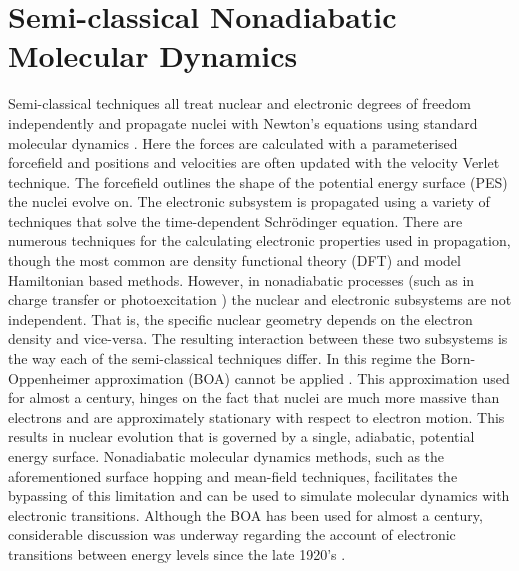 \section{Semi-classical Nonadiabatic Molecular Dynamics}
Semi-classical techniques all treat nuclear and electronic degrees of freedom independently and propagate nuclei with Newton's equations using standard molecular dynamics \cite{Coker1995Jan}. Here the forces are calculated with a parameterised forcefield and positions and velocities are often updated with the velocity Verlet technique. The forcefield outlines the shape of the potential energy surface (PES) the nuclei evolve on. The electronic subsystem is propagated using a variety of techniques that solve the time-dependent Schr\"odinger equation. There are numerous techniques for the calculating electronic properties used in propagation, though the most common are density functional theory (DFT) and model Hamiltonian based methods. However, in nonadiabatic processes (such as in charge transfer \cite{PhysRevB.79.115203} or photoexcitation \cite{Hammes-Schiffer2001Apr, Hammes-Schiffer1994Sep, Huynh2007}) the nuclear and electronic subsystems are not independent. That is, the specific nuclear geometry depends on the electron density and vice-versa. The resulting interaction between these two subsystems is the way each of the semi-classical techniques differ. In this regime the Born-Oppenheimer approximation (BOA) cannot be applied \cite{john_c._tully_nonadiabatic_nodate}. This approximation used for almost a century, \cite{Pisana2007Feb} hinges on the fact that nuclei are much more massive than electrons and are approximately stationary with respect to electron motion\cite{Born1927Jan}. This results in nuclear evolution that is governed by a single, adiabatic, potential energy surface. Nonadiabatic molecular dynamics methods, such as the aforementioned surface hopping and mean-field techniques, facilitates the bypassing of this limitation and can be used to simulate molecular dynamics with electronic transitions. Although the BOA has been used for almost a century, considerable discussion was underway regarding the account of electronic transitions between energy levels since the late 1920's \cite{Hund1927, Neumann1929, Kemble1929, doi:10.1098/rspa.1932.0165}. 
\\\\
